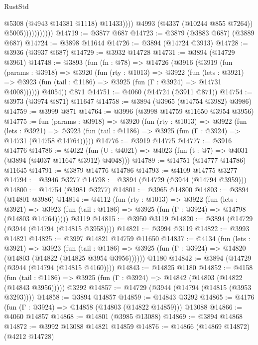 \begin{lexlean}{RustStd}
\begin{coremodule}
                                  @5308
                                  (@4943 @14381 @1118)
                                  @11433))))
                          @4993
                          (@4337 (@10244 @855 @7264))
                          @5005)))))))))))
@14719 := @3877 @687
@14723 := @3879 (@3883 @687) (@3889 @687)
@14724 := @3898 @11644
@14726 := @3894 (@14724 @3913)
@14728 := @3936 (@3937 @687)
@14729 := @3932 @14728
@14731 := @3894 (@14729 @3961)
@14748 := @3893
    (fun (fn : @78) =>
    @14726
      (@3916
        (@3919
          (fun (params : @3918) =>
          @3920
            (fun (rty : @1013) =>
            @3922
              (fun (lets : @3921) =>
              @3923 (fun (tail : @1186) => @3925 (fun (Γ : @3924) => @14731 @4008))))))
        @4054))
    @871
@14751 := @4060 (@14724 (@3911 @871))
@14754 := @3973 (@3974 @871) @11647
@14758 := @3894 (@3965 (@14754 @3982) @3986)
@14759 := @3999 @871
@14764 := @3996 (@3998 @14759 @11650 @3954 @3956)
@14775 := fun (params : @3918) =>
  @3920
    (fun (rty : @1013) =>
    @3922
      (fun (lets : @3921) =>
      @3923 (fun (tail : @1186) => @3925 (fun (Γ : @3924) => @14731 (@14758 @14764)))))
@14776 := @3919 @14775
@14777 := @3916 @14776
@14786 := @4022
    (fun (U : @4021) => @4023 (fun (t : @7) => @4031 (@3894 (@4037 @11647 @3912) @4048)))
@14789 := @14751 (@14777 @14786) @11645
@14791 := @3879 @14776 @14786
@14793 := @4109 @14775 @3277
@14794 := @3946 @3277
@14798 := @3894 (@14729 (@3944 (@14794 @3959)))
@14800 := @14754 (@3981 @3277)
@14801 := @3965 @14800
@14803 := @3894 (@14801 @3986)
@14814 := @4112
    (fun (rty : @1013) =>
    @3922
      (fun (lets : @3921) =>
      @3923 (fun (tail : @1186) => @3925 (fun (Γ : @3924) => @14798 (@14803 @14764)))))
    @3119
@14815 := @3950 @3119
@14820 := @3894 (@14729 (@3944 (@14794 (@14815 @3958))))
@14821 := @3994 @3119
@14822 := @3993 @14821
@14825 := @3997 @14821 @14759 @11650
@14837 := @4134
    (fun (lets : @3921) =>
    @3923
      (fun (tail : @1186) =>
      @3925 (fun (Γ : @3924) => @14820 (@14803 (@14822 (@14825 @3954 @3956))))))
    @1180
@14842 := @3894 (@14729 (@3944 (@14794 (@14815 @4160))))
@14843 := @14825 @1180
@14852 := @4158
    (fun (tail : @1186) => @3925 (fun (Γ : @3924) => @14842 (@14803 (@14822 (@14843 @3956)))))
    @3292
@14857 := @14729 (@3944 (@14794 (@14815 (@3953 @3293))))
@14858 := @3894 @14857
@14859 := @14843 @3292
@14865 := @4176 (fun (Γ : @3924) => @14858 (@14803 (@14822 @14859))) @13088
@14866 := @4060 @14857
@14868 := @14801 (@3985 @13088)
@14869 := @3894 @14868
@14872 := @3992 @13088 @14821 @14859
@14876 := @14866 (@14869 @14872) (@4212 @14728)

\end{coremodule}
\end{lexlean}
